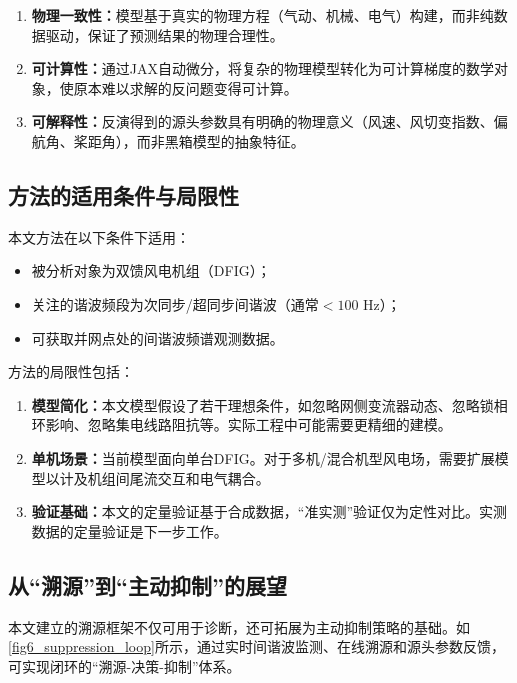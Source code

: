 \documentclass[withoutpreface,bwprint]{cumcmthesis}
\begin{document}
\begin{enumerate}
\item \textbf{物理一致性：}模型基于真实的物理方程（气动、机械、电气）构建，而非纯数据驱动，保证了预测结果的物理合理性。

\item \textbf{可计算性：}通过JAX自动微分，将复杂的物理模型转化为可计算梯度的数学对象，使原本难以求解的反问题变得可计算。

\item \textbf{可解释性：}反演得到的源头参数具有明确的物理意义（风速、风切变指数、偏航角、桨距角），而非黑箱模型的抽象特征。
\end{enumerate}

\subsection{方法的适用条件与局限性}

本文方法在以下条件下适用：

\begin{itemize}
\item 被分析对象为双馈风电机组（DFIG）；
\item 关注的谐波频段为次同步/超同步间谐波（通常$<100$ Hz）；
\item 可获取并网点处的间谐波频谱观测数据。
\end{itemize}

方法的局限性包括：

\begin{enumerate}
\item \textbf{模型简化：}本文模型假设了若干理想条件，如忽略网侧变流器动态、忽略锁相环影响、忽略集电线路阻抗等。实际工程中可能需要更精细的建模。

\item \textbf{单机场景：}当前模型面向单台DFIG。对于多机/混合机型风电场，需要扩展模型以计及机组间尾流交互和电气耦合。

\item \textbf{验证基础：}本文的定量验证基于合成数据，“准实测”验证仅为定性对比。实测数据的定量验证是下一步工作。
\end{enumerate}

\subsection{从“溯源”到“主动抑制”的展望}

本文建立的溯源框架不仅可用于诊断，还可拓展为主动抑制策略的基础。如\cref{fig6_suppression_loop}所示，通过实时间谐波监测、在线溯源和源头参数反馈，可实现闭环的“溯源-决策-抑制”体系。
\end{document}
